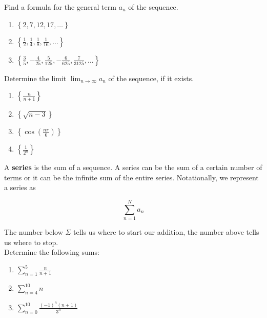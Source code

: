 \documentclass[12 pt]{article}
\begin{document}
Find a formula for the general term $a_{n}$ of the sequence.

\begin{enumerate}

\item $\left\{ 2, 7, 12, 17, \ldots \right\}$

\vspace{35mm}

\item $\left\{ \frac{1}{2}, \frac{1}{4}, \frac{1}{8}, \frac{1}{16}, \ldots \right\}$

\vspace{35mm}

\item $\left\{ \frac{3}{5},-\frac{4}{25}, \frac{5}{125},-\frac{6}{625}, \frac{7}{3125},\ldots \right\}$

\end{enumerate}

\newpage

Determine the limit $\lim_{n \to \infty} a_{n}$ of the sequence, if it exists. 

\begin{enumerate}

\item  ${\displaystyle \left\{ \frac{n}{n+1} \right\}}$

\vspace{40mm}

\item $ \left\{ \sqrt{n-3} \right\}$

\vspace{40mm}

\item $ \left\{ \cos \left( \frac{n\pi}{6} \right) \right\}$

\vspace{40mm}

\item ${\displaystyle \left\{ \frac{1}{2^n} \right\}}$

\end{enumerate}

\newpage

A {\bf series} is the sum of a sequence. A series can be the sum of a certain number of terms or it can be the infinite sum of the entire series. Notationally, we represent a series as

$$ {\displaystyle \sum\limits_{n=1}^{N} a_{n}}$$

The number below $\Sigma$ tells us where to start our addition, the number above tells us where to stop. \\

Determine the following sums:

\begin{enumerate}

\item $ {\displaystyle \sum\limits_{n=1}^{5} \frac{n}{n+1}  } $

\vspace{40mm}

\item $ {\displaystyle \sum\limits_{n=4}^{10} n  } $

\vspace{40mm}

\item $ {\displaystyle \sum\limits_{n=0}^{10} \frac{ (-1)^n (n+1)}{3^{n}} } $

\end{enumerate}
\end{document}
